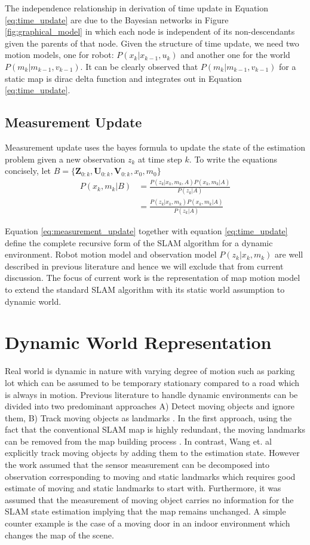 \documentclass[conference]{IEEEtran}
\begin{document}
The independence relationship in derivation of time update in Equation \ref{eq:time_update} are due to the Bayesian networks in Figure \ref{fig:graphical_model} in which each node is independent of its non-descendants given the parents of that node. Given the structure of time update, we need two motion models, one for robot: $P(x_k|x_{k-1},u_k)$ and another one for the world $P(m_k|m_{k-1},v_{k-1})$. It can be clearly observed that $P(m_k|m_{k-1},v_{k-1})$ for a static map is dirac delta function and integrates out in Equation \ref{eq:time_update}. 

\subsection{Measurement Update} Measurement update uses the bayes formula to update the state of the estimation problem given a new observation $z_k$ at time step $k$. To write the equations concisely, let $B =\{ \mathbf{Z}_{0:k},\mathbf{U}_{0:k},\mathbf{V}_{0:k},x_0,m_0 \}$
 \begin{align}
P(x_k,m_k|B) &= \frac{P(z_k|x_k,m_k,A)P(x_k,m_k|A)}{P(z_k|A)} \nonumber\\
&=\frac{P(z_k|x_k,m_k)P(x_k,m_k|A)}{P(z_k|A)}
\label{eq:measurement_update}
\end{align}

Equation \ref{eq:measurement_update} together with equation \ref{eq:time_update} define the complete recursive form of the SLAM algorithm for a dynamic environment. Robot motion model and observation model $P(z_k|x_k,m_k)$ are well described in previous literature and hence we will exclude that from current discussion. The focus of current work is the representation of map motion model to extend the standard SLAM algorithm with its static world assumption to dynamic world.

\section{Dynamic World Representation} Real world is dynamic in nature with varying degree of motion such as parking lot which can be assumed to be temporary stationary compared to a road which is always in motion. Previous literature to handle dynamic environments can be divided into two predominant approaches A) Detect moving objects and ignore them, B) Track moving objects as landmarks  \cite{bailey2006simultaneous}. In the first approach, using the fact that the conventional SLAM map is highly redundant, the moving landmarks can be removed from the map building process \cite{bailey2002mobile}. In contrast, Wang et. al \cite{wang2003online} explicitly track moving objects by adding them to the estimation state. However the work assumed that the sensor measurement can be decomposed into observation corresponding to moving and static landmarks which requires good estimate of moving and static landmarks to start with. Furthermore, it was assumed that the measurement of moving object carries no information for the SLAM state estimation implying that the map remains unchanged. A simple counter example is the case of a moving door in an indoor environment which changes the map of the scene.
\end{document}
